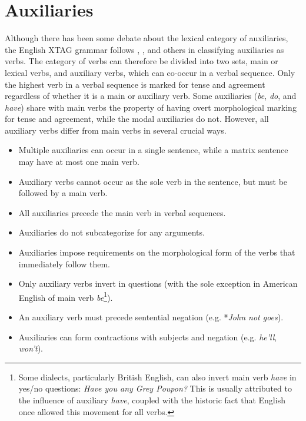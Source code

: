 \section{Auxiliaries}
\label{auxiliaries}

Although there has been some debate about the lexical category of auxiliaries,
the English XTAG grammar follows \cite{mccawley88}, \cite{haegeman91}, and
others in classifying auxiliaries as verbs. The category of verbs can therefore
be divided into two sets, main or lexical verbs, and auxiliary verbs, which can
co-occur in a verbal sequence.  Only the highest verb in a verbal sequence is
marked for tense and agreement regardless of whether it is a main or auxiliary
verb.  Some auxiliaries ({\it be}, {\it do}, and {\it have}) share with main
verbs the property of having overt morphological marking for tense and
agreement, while the modal auxiliaries do not.  However, all auxiliary verbs
differ from main verbs in several crucial ways.

\begin{itemize}

\item Multiple auxiliaries can occur in a single sentence, while a matrix
sentence may have at most one main verb. 

\item Auxiliary verbs cannot occur as the sole verb in the sentence, but must
be followed by a main verb.

\item All auxiliaries precede the main verb in verbal sequences.

\item Auxiliaries do not subcategorize for any arguments.

\item Auxiliaries impose requirements on the morphological form of the verbs
that immediately follow them.

\item Only auxiliary verbs invert in questions (with the sole exception in 
American English of main verb {\it be}\footnote{Some dialects, particularly
British English, can also invert main verb {\it have} in yes/no questions: {\it
Have you any Grey Poupon?}  This is usually attributed to the influence of
auxiliary {\it have}, coupled with the historic fact that English once allowed
this movement for all verbs.\label{have-footnote}}).

\item An auxiliary verb must precede sentential negation (e.g. *{\it John not goes}).

\item Auxiliaries can form contractions with subjects and negation (e.g. {\it
he'll}, {\it won't}).

\end{itemize}


